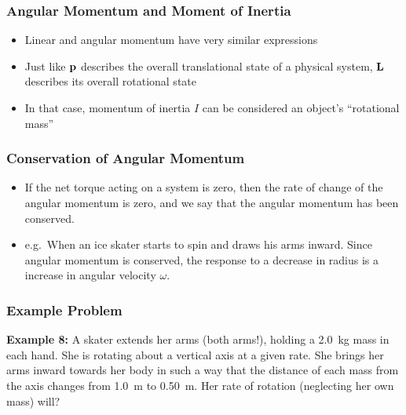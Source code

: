 \documentclass[12pt,compress,aspectratio=169]{beamer}
\newcommand{\mb}[1]{\ensuremath\mathbf{#1}}
\begin{document}
\begin{frame}
  \frametitle{Angular Momentum and Moment of Inertia}
  \begin{itemize}
  \item Linear and angular momentum have very similar expressions
    
    \vspace{-0.25in}{\Large
      \begin{displaymath}
        \mb{p}=m\mb{v}\quad\quad\quad \mb{L}=I\bm{\omega}
      \end{displaymath}
    }
  \item Just like $\mb{p}$ describes the overall translational state of a
    physical system, $\mb{L}$ describes its overall rotational state
  \item In that case, momentum of inertia $I$ can be considered an object's
    ``rotational mass''
  \end{itemize}
\end{frame}



\begin{frame}
  \frametitle{Conservation of Angular Momentum}

  \vspace{-0.35in}{\Large
    \begin{displaymath}
      \tau=rF=rm\frac{dv}{dt}=\frac{d(rmv)}{dt}\quad\longrightarrow\quad
      \boxed{\bm{\tau} =\frac{d\mb{L}}{dt}}
    \end{displaymath}
  }
  \begin{itemize}
  \item If the net torque acting on a system is zero, then the rate of change
    of the angular momentum is zero, and we say that the angular momentum has
    been conserved. 
  \item e.g.\ When an ice skater starts to spin and draws his arms inward.
    Since angular momentum is conserved, the response to a decrease in radius
    is a increase in angular velocity $\omega$.
  \end{itemize}
\end{frame}


\begin{frame}
  \frametitle{Example Problem}
  \textbf{Example 8:} A skater extends her arms (both arms!), holding a
  \SI{2.0}{\kg} mass in each hand. She is rotating about a vertical axis at a
  given rate. She brings her arms inward towards her body in such a way that
  the distance of each mass from the axis changes from \SI{1.0}{\metre} to
  \SI{0.50}{\metre}. Her rate of rotation (neglecting her own mass) will?
\end{frame}
\end{document}
